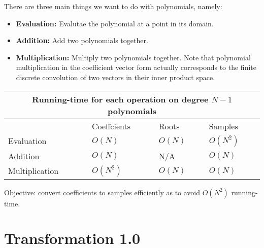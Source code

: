 \documentclass{beamer}
\begin{document}
\begin{frame}
There are three main things we want to do with polynomials, namely:
\begin{itemize}
\item{\textbf{Evaluation:}} Evalutae the polynomial at a point in its domain.
\item{\textbf{Addition:}} Add two polynomials together.
\item{\textbf{Multiplication:}} Multiply two polynomials together. 
Note that polynomial multiplication in the coefficient vector form actually corresponds to the finite discrete convolution of two vectors in their inner product space. 
\end{itemize}
\end{frame}

\begin{frame}

\begin{tabular}{|p{2cm}||p{2cm}|p{2cm}|p{2cm}|}
\hline
\multicolumn{4}{|c|}{Running-time for each operation on degree $N-1$ polynomials}\\
\hline
&Coeffcients&Roots&Samples\\
\hline\hline
Evaluation&$O(N)$&$O(N)$&$O(N^2)$\\
\hline
Addition&$O(N)$&N/A&$O(N)$\\
\hline
Multiplication&$O(N^2)$&$O(N)$&$O(N)$\\
\hline
\end{tabular}

\bigskip
Objective: convert coefficients to samples efficiently as to avoid $O(N^2)$ running-time.
\end{frame}

\section[Transformation 1.0]{Transformation 1.0}
\end{document}
